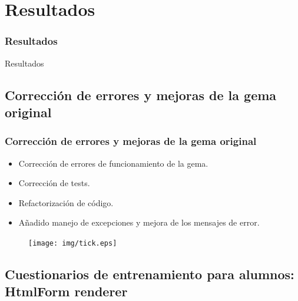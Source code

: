 \documentclass{beamer}
\begin{document}

\section{Resultados}
\begin{frame}
\frametitle{Resultados}
  
  \begin{center}
    \Huge{Resultados}
  \end{center}
\end{frame}

\subsection{Corrección de errores y mejoras de la gema original}
\begin{frame}
\frametitle{Corrección de errores y mejoras de la gema original}
  \bigskip
  \bigskip
  
  \begin{itemize}
    \item Corrección de errores de funcionamiento de la gema.
    \item Corrección de tests.
    \item Refactorización de código.
    \item Añadido manejo de excepciones y mejora de los mensajes de error.
  \end{itemize}
  
  \begin{figure}
    \hfill\texttt{[image: img/tick.eps]}
  \end{figure}
  
\end{frame}
  
\subsection{Cuestionarios de entrenamiento para alumnos: HtmlForm renderer}
  
\end{document}
